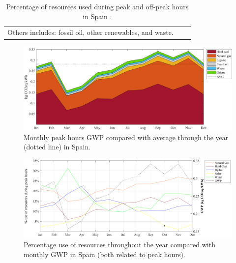 {{{ \begin{table}[htbp]
\centering
\caption{Percentage of resources used during peak and off-peak hours in Spain \cite{Entso-eProduction}.}
\label{RES_ES}
\begin{tabular}{ccc}
\multicolumn{1}{c}{\footnotesize*Others includes: fossil oil, other renewables, and waste.}
\end{tabular}

\end{table}



\begin{figure}[htbp]
	\centering
	\includegraphics[width=1\textwidth]{ChapterLCA/Images/GWP_plots/Spain_GWP.png}
	\caption{Monthly peak hours GWP compared with average through the year (dotted line) in Spain.}
	\label{GWP_ES}
\end{figure}

	
\begin{figure}[htbp]
	\centering
	\includegraphics[width=1\textwidth]{ChapterLCA/Images/GWP_plots/Comp_GWP_ES.png}
	\caption{Percentage use of resources throughout the year compared with monthly GWP in Spain (both related to peak hours).}
	\label{COMP_ES}
\end{figure}

}}}
